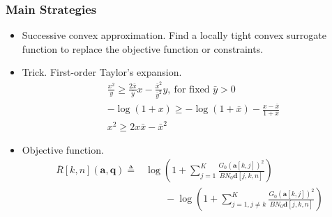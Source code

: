 \documentclass[11.5pt]{beamer}
\begin{document}
\begin{frame}
\frametitle{Main Strategies}
	\begin{itemize}
		\item<1-> \alert{Successive convex approximation.} Find a locally tight convex surrogate function to replace the objective function or constraints.
		\item<2-> Trick. \alert{First-order Taylor's expansion.}
		\begin{subequations}
			\begin{flalign*}
			&\frac{x^2}{y} \geq \frac{2\bar{x}}{\bar{y}}x-\frac{\bar{x}^2}{\bar{y}^2}y,\ \text{for fixed }\bar{y}>0 \\
			&-\log(1+x) \geq -\log(1+\bar{x}) - \frac{x-\bar{x}}{1+\bar{x}} \\
			&x^2 \geq 2x\bar{x}-\bar{x}^2
			\end{flalign*}
		\end{subequations}
		\item<3-> Objective function. 
		\begin{equation}\label{obj2}
			\begin{array}{rl}
				\overline{R}[k,n](\boldsymbol{a},\boldsymbol{q}) \triangleq & \log\left(1+\sum_{j=1}^K\frac{G_0(\boldsymbol{a}[k,j])^2}{BN_0\boldsymbol{d}[j,k,n]}\right)\\
				&\qquad-\log\left(1+\sum_{j=1,j\ne k}^K\frac{G_0(\boldsymbol{a}[k,j])^2}{BN_0\boldsymbol{d}[j,k,n]}\right)
			\end{array}
		\end{equation}
	\end{itemize}
\end{frame}
\end{document}
